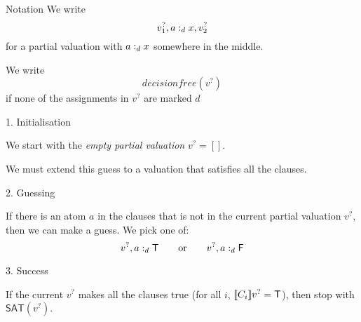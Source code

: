 \documentclass[xetex,aspectratio=169,14pt,hyperref={pdfpagelabels=true,pdflang={en-GB}}]{beamer}
\begin{document}
\begin{frame}
  {Notation}
  We write
  \begin{displaymath}
    v_1^?, a :_d x, v_2^?
  \end{displaymath}
  for a partial valuation with $a :_d x$ somewhere in
  the middle.

  \bigskip

  We write
  \begin{displaymath}
    \mathit{decisionfree}(v^?)
  \end{displaymath}
  if none of the assignments in $v^?$ are marked $d$ \\
\end{frame}

\begin{frame}
  {1. Initialisation}

  We start with the \emph{empty partial valuation} $v^? = []$.\\

  \medskip

  We must extend this guess to a valuation that satisfies all the clauses.

\end{frame}

\begin{frame}
  {2. Guessing}

  If there is an atom $a$ in the clauses that is not in the current
  partial valuation $v^?$, then we can make a guess. We pick one of:
  \begin{displaymath}
    v^?, a :_d \mathsf{T} \qquad \textrm{or} \qquad v^?, a :_d \mathsf{F}
  \end{displaymath}

\end{frame}

\begin{frame}
  {3. Success}

  If the current $v^?$ makes all the clauses true (for all $i$,
  $\llbracket C_i \rrbracket v^? = \mathsf{T}$), then stop with $\mathsf{SAT}(v^?)$.
\end{frame}

\def\doneafter<#1>#2{%
  \temporal<#1>%
  {\colorbox{white}{\color{black}$\displaystyle#2$}}%
  {\colorbox{green!50}{\color{black}$\displaystyle#2$}}%
  {\colorbox{green!50}{\color{black}$\displaystyle#2$}}}

\def\stuck<#1>#2{%
  \temporal<#1>%
  {\colorbox{white}{\color{black}$\displaystyle#2$}}%
  {\colorbox{red!50}{\color{black}$\displaystyle#2$}}%
  {\colorbox{white}{\color{black}$\displaystyle#2$}}}
\end{document}
